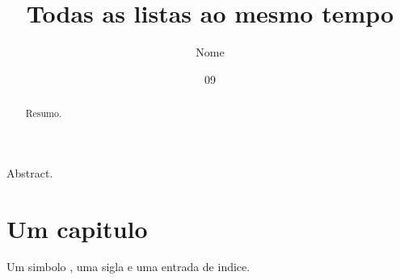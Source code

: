 \documentclass[dsc]{ufrj}
\title{Todas as listas ao mesmo tempo}
\author{Nome}{Sobrenome}
\date{09}{2026}
\begin{document}
  \maketitle
  \frontmatter
  \begin{abstract}Resumo.\end{abstract}
  \begin{foreignabstract}Abstract.\end{foreignabstract}
  \listoffigures
  \listofquadros
  \listofprogramas
  \listofalgorithms
  \listofmapas
  \listoftables
  \printloabbreviations
  \printlosymbols
  \tableofcontents
  \mainmatter
  \chapter{Um capitulo}
  Um simbolo , uma sigla
   e uma entrada de
  indice.
  \printindex
\end{document}
